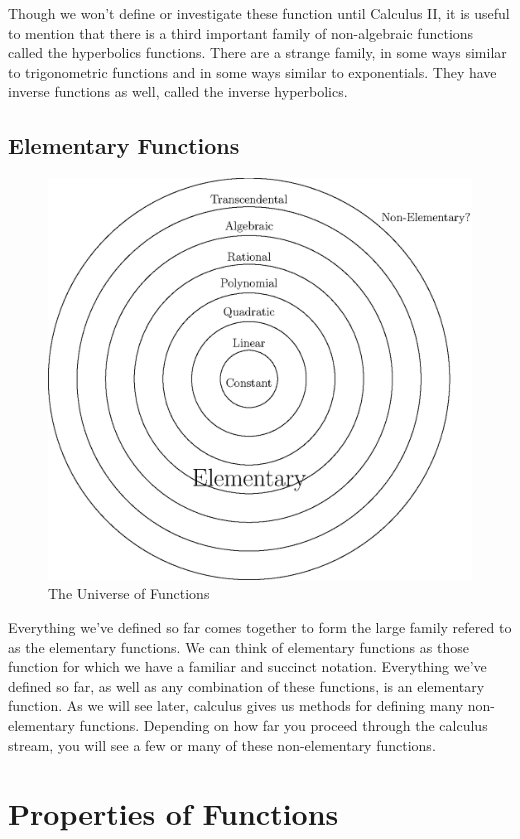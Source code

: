 \documentclass[fleqn]{report}
\begin{document}
Though we won't define or investigate these function until
Calculus II, it is useful to mention that there is a third important
family of non-algebraic functions called the hyperbolics
functions. There are a strange family, in some ways similar
to trigonometric functions and in some ways similar to
exponentials. They have inverse functions as well, called the
inverse hyperbolics. 

\subsection*{Elementary Functions}

\begin{figure}[t]
\centering
\includegraphics[width=12cm]{figure35.eps}
\caption{The Universe of Functions}
\label{The Universe of Functions}
\end{figure}

Everything we've defined so far comes together to form the
large family refered to as the elementary functions. We can think
of elementary functions as those function for which we have a
familiar and succinct notation. Everything we've defined so far,
as well as any combination of these functions, is an
elementary function. As we will see later, calculus gives us
methods for defining many non-elementary functions. Depending
on how far you proceed through the calculus stream, you will
see a few or many of these non-elementary functions.
\clearpage

\section*{Properties of Functions}
\end{document}

